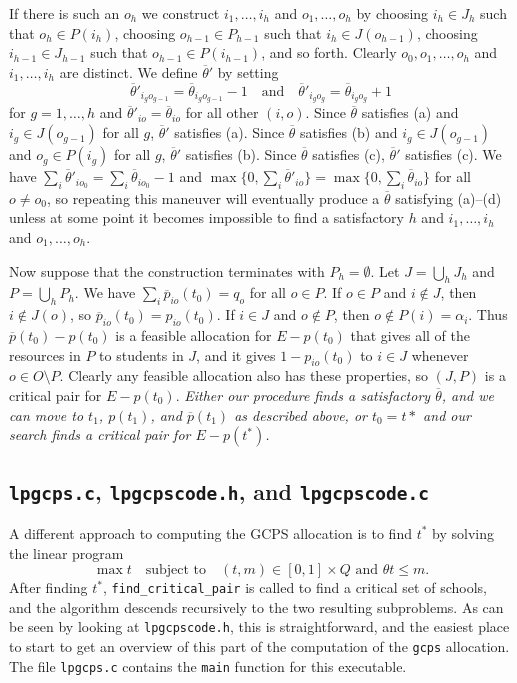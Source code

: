 \documentclass[12pt]{article}
\theoremstyle{definition}
\newcommand{\barp}{\overline{p}}
\newcommand{\bartheta}{{\overline \theta}}
\begin{document}
\begin{appendix}
If there is such an $o_h$ we construct $i_1, \ldots, i_h$ and $o_1,
\ldots, o_h$ by choosing $i_h \in J_h$ such that $o_h \in P(i_h)$,
choosing $o_{h-1} \in P_{h-1}$ such that $i_h \in J(o_{h-1})$,
choosing $i_{h-1} \in J_{h-1}$ such that $o_{h-1} \in P(i_{h-1})$, and
so forth.  Clearly $o_0,o_1, \ldots, o_h$ and $i_1, \ldots, i_h$ are
distinct.  We define $\bartheta'$ by setting $$\bartheta'_{i_go_{g-1}}
= \bartheta_{i_go_{g-1}} - 1 \quad \text{and} \quad
\bartheta'_{i_go_g} = \bartheta_{i_go_g} + 1$$ for $g = 1, \ldots, h$
and $\bartheta'_{io} = \bartheta_{io}$ for all other $(i,o)$.  Since
$\bartheta$ satisfies (a) and $i_g \in J(o_{g-1})$ for all $g$,
$\bartheta'$ satisfies (a).  Since $\bartheta$ satisfies (b) and $i_g
\in J(o_{g-1})$ and $o_g \in P(i_g)$ for all $g$, $\bartheta'$
satisfies (b).  Since $\bartheta$ satisfies (c), $\bartheta'$
satisfies (c).  We have $\sum_i \bartheta'_{io_0} = \sum_i
\bartheta_{io_0} - 1$ and $\max \{0,\sum_i \bartheta'_{io}\} = \max
\{0,\sum_i \bartheta_{io}\}$ for all $o \ne o_0$, so repeating this
maneuver will eventually produce a $\bartheta$ satisfying (a)--(d)
unless at some point it becomes impossible to find a satisfactory $h$
and $i_1, \ldots, i_h$ and $o_1, \ldots, o_h$.

Now suppose that the construction terminates with $P_h = \emptyset$.
Let $J = \bigcup_h J_h$ and $P = \bigcup_h P_h$.  We have $\sum_i
\barp_{io}(t_0) = q_o$ for all $o \in P$.  If $o \in P$ and $i \notin
J$, then $i \notin J(o)$, so $\barp_{io}(t_0) = p_{io}(t_0)$.  If $i
\in J$ and $o \notin P$, then $o \notin P(i) = \alpha_i$.  Thus
$\barp(t_0) - p(t_0)$ is a feasible allocation for $E - p(t_0)$ that
gives all of the resources in $P$ to students in $J$, and it gives $1
- p_{io}(t_0)$ to $i \in J$ whenever $o \in O \setminus P$. Clearly
any feasible allocation also has these properties, so $(J,P)$ is a
critical pair for $E - p(t_0)$.  \emph{Either our procedure finds a
satisfactory $\bartheta$, and we can move to $t_1$, $p(t_1)$, and
$\barp(t_1)$ as described above, or $t_0 = t*$ and our search finds a
critical pair for $E - p(t^*)$.}

\subsection{\texttt{lpgcps.c}, \texttt{lpgcpscode.h}, and \texttt{lpgcpscode.c}}

A different approach to computing the GCPS allocation is to find $t^*$
by solving the linear program
$$\max t \quad \text{subject to} \quad \text{$(t,m) \in [0,1] \times
  Q$ and $\theta t \le m$}.$$ After finding $t^*$,
\texttt{find\_critical\_pair} is called to find a critical set of
schools, and the algorithm descends recursively to the two resulting
subproblems.  As can be seen by looking at \texttt{lpgcpscode.h}, this
is straightforward, and the easiest place to start to get an overview
of this part of the computation of the \texttt{gcps} allocation.  The
file \texttt{lpgcps.c} contains the \texttt{main} function for this
executable.


\end{appendix}
\end{document}
